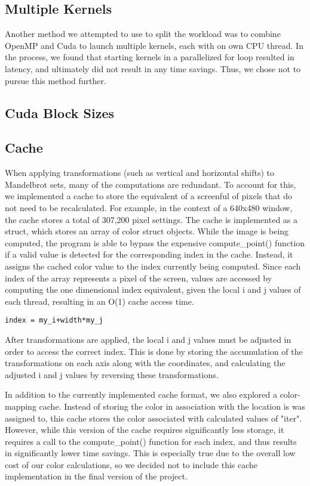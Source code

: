 \documentclass{article}
\begin{document}
\subsection{Multiple Kernels}

Another method we attempted to use to split the workload was to combine OpenMP and Cuda to launch multiple kernels, each with on own CPU thread. In the process, we found that starting kernels in a parallelized for loop resulted in latency, and ultimately did not result in any time savings. Thus, we chose not to pursue this method further.

\subsection{Cuda Block Sizes}

\subsection{Cache}

When applying transformations (such as vertical and horizontal shifts) to Mandelbrot sets, many of the computations are redundant. To account for this, we implemented a cache to store the equivalent of a screenful of pixels that do not need to be recalculated. For example, in the context of a 640x480 window, the cache stores a total of 307,200 pixel settings. The cache is implemented as a struct, which stores an array of color struct objects. While the image is being computed, the program is able to bypass the expensive compute\_point() function if a valid value is detected for the corresponding index in the cache. Instead, it assigns the cached color value to the index currently being computed. Since each index of the array represents a pixel of the screen, values are accessed by computing the one dimensional index equivalent, given the local i and j values of each thread, resulting in an O(1) cache access time. 

\begin{verbatim}
index = my_i+width*my_j
\end{verbatim}

After transformations are applied, the local i and j values must be adjusted in order to access the correct index. This is done by storing the accumulation of the transformations on each axis along with the coordinates, and calculating the adjusted i and j values by reversing these transformations. 

In addition to the currently implemented cache format, we also explored a color-mapping cache. Instead of storing the color in association with the location is was assigned to, this cache stores the color associated with calculated values of "iter". However, while this version of the cache requires significantly less storage, it requires a call to the compute\_point() function for each index, and thus results in significantly lower time savings. This is especially true due to the overall low cost of our color calculations, so we decided not to include this cache implementation in the final version of the project.
\end{document}
